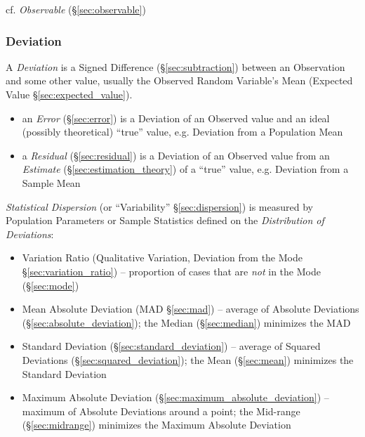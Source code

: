 \fist cf. \emph{Observable} (\S\ref{sec:observable})



\subsubsection{Deviation}\label{sec:deviation}

A \emph{Deviation} is a Signed Difference (\S\ref{sec:subtraction}) between an
Observation and some other value, usually the Observed Random Variable's Mean
(Expected Value \S\ref{sec:expected_value}).

\begin{itemize}
  \item an \emph{Error} (\S\ref{sec:error}) is a Deviation of an Observed value
    and an ideal (possibly theoretical) ``true'' value, e.g. Deviation from a
    Population Mean
  \item a \emph{Residual} (\S\ref{sec:residual}) is a Deviation of an Observed
    value from an \emph{Estimate} (\S\ref{sec:estimation_theory}) of a ``true''
    value, e.g. Deviation from a Sample Mean
\end{itemize}

\emph{Statistical Dispersion} (or ``Variability'' \S\ref{sec:dispersion}) is
measured by Population Parameters or Sample Statistics defined on the
\emph{Distribution of Deviations}:
\begin{itemize}
  \item Variation Ratio (Qualitative Variation, Deviation from the Mode
    \S\ref{sec:variation_ratio}) -- proportion of cases that are \emph{not} in
    the Mode (\S\ref{sec:mode})
  \item Mean Absolute Deviation (MAD \S\ref{sec:mad}) -- average of Absolute
    Deviations (\S\ref{sec:absolute_deviation}); the Median (\S\ref{sec:median})
    minimizes the MAD
  \item Standard Deviation (\S\ref{sec:standard_deviation}) -- average of
    Squared Deviations (\S\ref{sec:squared_deviation}); the Mean
    (\S\ref{sec:mean}) minimizes the Standard Deviation
  \item Maximum Absolute Deviation (\S\ref{sec:maximum_absolute_deviation}) --
    maximum of Absolute Deviations around a point; the Mid-range
    (\S\ref{sec:midrange}) minimizes the Maximum Absolute Deviation
\end{itemize}

